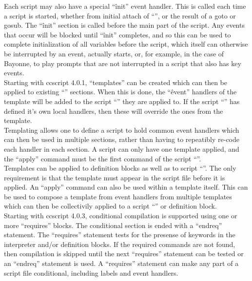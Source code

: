 \documentclass[a4paper,12pt]{article}
\begin{document}
Each script may also have a special ``\^init'' event handler.  This is called
each time a script is started, whether from initial attach of ``\@main'', or
the result of a goto or gosub.  The ``\^init'' section is called before the
main part of the script.  Any events that occur will be blocked until
``\^init'' completes, and so this can be used to complete initialization of all
variables before the script, which itself can otherwise be interrupted by an
event, actually starts, or, for example, in the case of Bayonne, to play
prompts that are not interrupted in a script that also has key events. \\

Starting with ccscript 4.0.1, ``templates'' can be created which can then be
applied to existing ``\@script'' sections.  When this is done, the ``\^event''
handlers of the template will be added to the script ``\@section'' they are
applied to.  If the script ``\@section'' has defined it's own local handlers,
then these will override the ones from the template. \\

Templating allows one to define a script to hold common event handlers which
can then be used in multiple sections, rather than having to repeatibly re-code
each handler in each section.  A script can only have one template applied, and
the ``apply'' command must be the first command of the script ``\@section''. \\

Templates can be applied to definition blocks as well as to script
``\@sections''.  The only requirement is that the template must appear in the
script file before it is applied.  An ``apply'' command can also be used within
a template itself.  This can be used to compose a template from event handlers
from multiple templates which can then be collectivily applied to a script
``\@section'' or definition block. \\

Starting with ccscript 4.0.3, conditional compilation is supported using one
or more ``requires'' blocks.  The conditional section is ended with a ``endreq''
statement.  The ``requires'' statement tests for the presense of keywords in
the interpreter and/or definition blocks.  If the required commands are not
found, then compilation is skipped until the next ``requires'' statement can
be tested or an ``endreq'' statement is used.  A ``requires'' statement can
make any part of a script file conditional, including labels and event
handlers. \\
\end{document}
